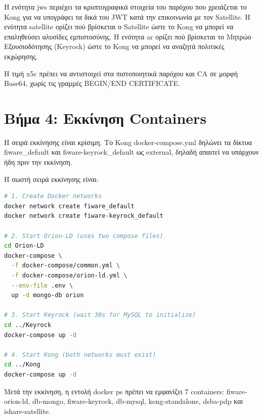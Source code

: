 Η ενότητα \textlatin{jws} περιέχει τα κρυπτογραφικά στοιχεία του
παρόχου που χρειάζεται το \textlatin{Kong} για να υπογράφει τα
δικά του \textlatin{JWT} κατά την επικοινωνία με τον
\textlatin{Satellite}. Η ενότητα \textlatin{satellite} ορίζει πού
βρίσκεται ο \textlatin{Satellite} ώστε το \textlatin{Kong} να
μπορεί να επαληθεύσει αλυσίδες εμπιστοσύνης. Η ενότητα \textlatin{ar}
ορίζει πού βρίσκεται το Μητρώο Εξουσιοδότησης (\textlatin{Keyrock})
ώστε το \textlatin{Kong} να μπορεί να αναζητά πολιτικές εκχώρησης.

Η τιμή \textlatin{x5c} πρέπει να αντιστοιχεί στα πιστοποιητικά
παρόχου και \textlatin{CA} σε μορφή \textlatin{Base64}, χωρίς
τις γραμμές \textlatin{BEGIN/END CERTIFICATE}.

\section{Βήμα 4: Εκκίνηση \textlatin{Containers}}
\label{sec:step4-startup}

Η σειρά εκκίνησης είναι κρίσιμη. Το \textlatin{Kong}
\textlatin{docker-compose.yml} δηλώνει τα δίκτυα \textlatin{fiware\_default}
και \textlatin{fiware-keyrock\_default} ως \textlatin{external}, δηλαδή
απαιτεί να υπάρχουν ήδη πριν την εκκίνηση.

Η σωστή σειρά εκκίνησης είναι:

\begin{lstlisting}[language=bash, caption={Docker network creation and container startup order.}, stringstyle=\color{black}, keywordstyle=\color{black}]
# 1. Create Docker networks
docker network create fiware_default
docker network create fiware-keyrock_default

# 2. Start Orion-LD (uses two compose files)
cd Orion-LD
docker-compose \
  -f docker-compose/common.yml \
  -f docker-compose/orion-ld.yml \
  --env-file .env \
  up -d mongo-db orion

# 3. Start Keyrock (wait 30s for MySQL to initialize)
cd ../Keyrock
docker-compose up -d

# 4. Start Kong (both networks must exist)
cd ../Kong
docker-compose up -d
\end{lstlisting}
\selectlanguage{greek}

Μετά την εκκίνηση, η εντολή \textlatin{docker ps} πρέπει να
εμφανίζει 7 \textlatin{containers}: \textlatin{fiware-orion-ld},
\textlatin{db-mongo}, \textlatin{fiware-keyrock}, \textlatin{db-mysql},
\textlatin{kong-standalone}, \textlatin{dsba-pdp} και
\textlatin{ishare-satellite}.

